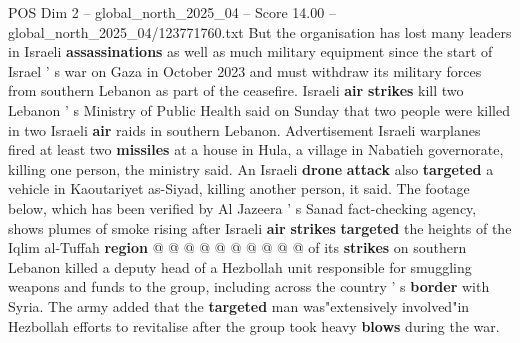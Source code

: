\begin{textsample}{POS Dim 2 – global\_north\_2025\_04 – Score 14.00 – global\_north\_2025\_04/123771760.txt}
But the organisation has lost many leaders in Israeli \textbf{assassinations} as well as much military equipment since the start of Israel ' s war on Gaza in October 2023 and must withdraw its military forces from southern Lebanon as part of the ceasefire.
Israeli \textbf{air} \textbf{strikes} kill two Lebanon ' s Ministry of Public Health said on Sunday that two people were killed in two Israeli \textbf{air} raids in southern Lebanon.
Advertisement Israeli warplanes fired at least two \textbf{missiles} at a house in Hula, a village in Nabatieh governorate, killing one person, the ministry said.
An Israeli \textbf{drone} \textbf{attack} also \textbf{targeted} a vehicle in Kaoutariyet as-Siyad, killing another person, it said.
The footage below, which has been verified by Al Jazeera ' s Sanad fact-checking agency, shows plumes of smoke rising after Israeli \textbf{air} \textbf{strikes} \textbf{targeted} the heights of the Iqlim al-Tuffah \textbf{region} @ @ @ @ @ @ @ @ @ @ of its \textbf{strikes} on southern Lebanon killed a deputy head of a Hezbollah unit responsible for smuggling weapons and funds to the group, including across the country ' s \textbf{border} with Syria.
The army added that the \textbf{targeted} man was"extensively involved"in Hezbollah efforts to revitalise after the group took heavy \textbf{blows} during the war.

\end{textsample}
